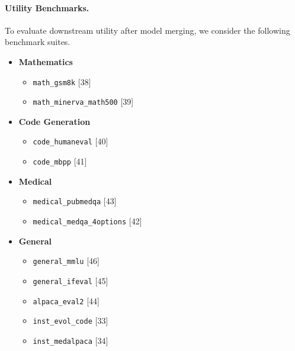 

\paragraph{Utility Benchmarks.}

To evaluate downstream utility after model merging, we consider the following benchmark suites.

\begin{itemize}

\item \textbf{Mathematics}
\begin{itemize}
    \item \texttt{math\_gsm8k} [38]
    \item \texttt{math\_minerva\_math500} [39]
\end{itemize}

\item \textbf{Code Generation}
\begin{itemize}
    \item \texttt{code\_humaneval} [40]
    \item \texttt{code\_mbpp} [41]
\end{itemize}

\item \textbf{Medical}
\begin{itemize}
    \item \texttt{medical\_pubmedqa} [43]
    \item \texttt{medical\_medqa\_4options} [42]
\end{itemize}

\item \textbf{General}
\begin{itemize}
    \item \texttt{general\_mmlu} [46]
    \item \texttt{general\_ifeval} [45]
    \item \texttt{alpaca\_eval2} [44]
    \item \texttt{inst\_evol\_code} [33]
    \item \texttt{inst\_medalpaca} [34]
\end{itemize}

\end{itemize}


